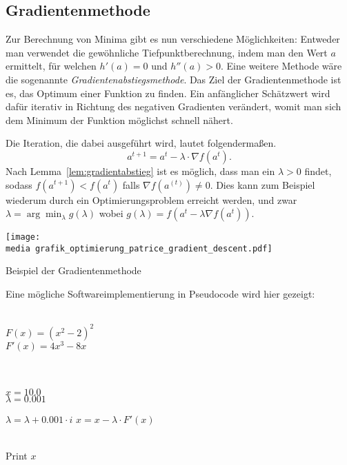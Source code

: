 \subsection{Gradientenmethode}

Zur Berechnung von Minima gibt es nun verschiedene Möglichkeiten:
Entweder man verwendet die gewöhnliche Tiefpunktberechnung, indem man den Wert $a$
 ermittelt, f\"ur welchen $h'(a)=0$ und $h''(a)>0$. 
Eine weitere Methode w\"are die sogenannte \emph{Gradientenabstiegsmethode}. Das Ziel der Gradientenmethode ist es, das Optimum einer Funktion zu finden. Ein anfänglicher Schätzwert wird dafür iterativ in Richtung des negativen Gradienten 
ver\"andert, womit man sich dem Minimum der Funktion möglichst schnell n\"ahert.

Die Iteration, die dabei ausgef\"uhrt wird, lautet folgenderma\ss en. 
\begin{equation*}
a^{t+1}  =a^{t} - \lambda \cdot \nabla  f(a^{t}).
\end{equation*}
Nach Lemma~\ref{lem:gradientabstieg} ist es m\"oglich, dass man ein $\lambda > 0$ findet, sodass $f(a^{t+1}) < f(a^{t})$ falls $ \nabla f(a^{(t)}) \neq 0$. 
Dies kann zum Beispiel wiederum durch ein Optimierungsproblem erreicht werden, und zwar $\lambda=\arg\min_{\lambda} g(\lambda)$ wobei $g(\lambda)=f(a^t-\lambda\nabla f(a^t))$.




\begin{dsafigure}
\begin{center}
\texttt{[image: \\media grafik\_optimierung\_patrice\_gradient\_descent.pdf]}
\label{figure:grafik_optimierung_patrice_gradient_descent}
\caption{Beispiel der Gradientenmethode}
\end{center}
\end{dsafigure}

Eine mögliche Softwareimplementierung in Pseudocode wird hier gezeigt:

\begin{algorithmic}[1]

   \\$F(x) = (x^2-2)^2$
\\$F'(x) = 4x^3-8x$

\\
\\$x = 10.0$
\\$\lambda = 0.001$

 \State $\lambda = \lambda+0.001\cdot i$
    \State $x = x - \lambda \cdot F'(x)$
  \EndFor
\EndFor
 
 
\\Print $x$\EndProcedure
\Statex
\end{algorithmic}

